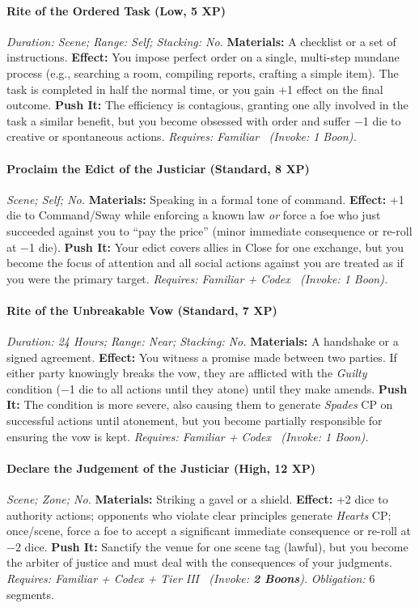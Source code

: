 \documentclass[12pt,twoside]{book}
\begin{document}
\paragraph{Rite of the Ordered Task (Low, 5 XP)} \emph{Duration: Scene; Range: Self; Stacking: No.}
\textbf{Materials:} A checklist or a set of instructions.
\textbf{Effect:} You impose perfect order on a single, multi-step mundane process (e.g., searching a room, compiling reports, crafting a simple item). The task is completed in half the normal time, or you gain +1 effect on the final outcome.
\textbf{Push It:} The efficiency is contagious, granting one ally involved in the task a similar benefit, but you become obsessed with order and suffer −1 die to creative or spontaneous actions.
\emph{Requires: Familiar \ (\textit{Invoke:} 1 Boon).}
\paragraph{Proclaim the Edict of the Justiciar (Standard, 8 XP)} \emph{Scene; Self; No.}
\textbf{Materials:} Speaking in a formal tone of command.
\textbf{Effect:} +1 die to Command/Sway while enforcing a known law \emph{or} force a foe who just succeeded against you to ``pay the price'' (minor immediate consequence or re-roll at −1 die).
\textbf{Push It:} Your edict covers allies in Close for one exchange, but you become the focus of attention and all social actions against you are treated as if you were the primary target.
\emph{Requires: Familiar + Codex \ (\textit{Invoke:} 1 Boon).}
\paragraph{Rite of the Unbreakable Vow (Standard, 7 XP)} \emph{Duration: 24 Hours; Range: Near; Stacking: No.}
\textbf{Materials:} A handshake or a signed agreement.
\textbf{Effect:} You witness a promise made between two parties. If either party knowingly breaks the vow, they are afflicted with the \emph{Guilty} condition (−1 die to all actions until they atone) until they make amends.
\textbf{Push It:} The condition is more severe, also causing them to generate \emph{Spades} CP on successful actions until atonement, but you become partially responsible for ensuring the vow is kept.
\emph{Requires: Familiar + Codex \ (\textit{Invoke:} 1 Boon).}
\paragraph{Declare the Judgement of the Justiciar (High, 12 XP)} \emph{Scene; Zone; No.}
\textbf{Materials:} Striking a gavel or a shield.
\textbf{Effect:} +2 dice to authority actions; opponents who violate clear principles generate \emph{Hearts} CP; once/scene, force a foe to accept a significant immediate consequence or re-roll at −2 dice.
\textbf{Push It:} Sanctify the venue for one scene tag (lawful), but you become the arbiter of justice and must deal with the consequences of your judgments.
\emph{Requires: Familiar + Codex + Tier III \ (\textit{Invoke:} \textbf{2 Boons}).}
\emph{Obligation:} 6 segments.
\end{document}
